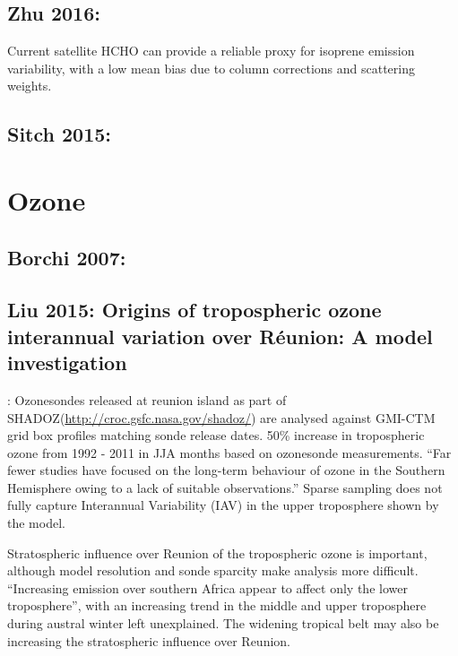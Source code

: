 \documentclass[11pt]{article} %
\begin{document}
  \subsection{Zhu 2016: }
    \citet{Zhu2016}
    Current satellite HCHO can provide a reliable proxy for isoprene emission variability, with a low mean bias due to column corrections and scattering weights.
    
  \subsection{Sitch 2015: }

\section{Ozone}
  \subsection{Borchi 2007:}


  \subsection{Liu 2015: Origins of tropospheric ozone interannual variation over Réunion: A model investigation}
    \citet{Liu2015}:
    Ozonesondes released at reunion island as part of SHADOZ(\url{http://croc.gsfc.nasa.gov/shadoz/}) are analysed against GMI-CTM grid box profiles matching sonde release dates.
    50\% increase in tropospheric ozone from 1992 - 2011 in JJA months based on ozonesonde measurements.
    ``Far fewer studies have focused on the long-term behaviour of ozone in the Southern Hemisphere owing to a lack of suitable observations.''
    Sparse sampling does not fully capture Interannual Variability (IAV) in the upper troposphere shown by the model.
    
    Stratospheric influence over Reunion of the tropospheric ozone is important, although model resolution and sonde sparcity make analysis more difficult.
    ``Increasing emission over southern Africa appear to affect only the lower troposphere'', with an increasing trend in the middle and upper troposphere during austral winter left unexplained.
    The widening tropical belt may also be increasing the stratospheric influence over Reunion.
\end{document}
